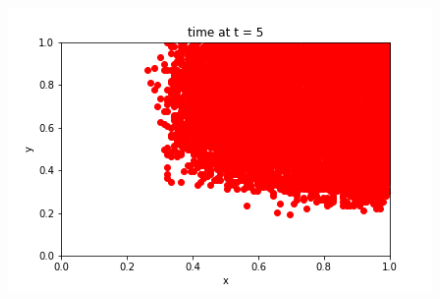 \documentclass[12pt, reqno]{amsart}
\begin{document}
\begin{figure}[h]
\begin{minipage}[b]{0.45 \textwidth}
            \caption{}
            \label{fig:day2}
        \end{minipage}
        \hfill
        \begin{minipage}[b]{0.45 \textwidth}
            \includegraphics[width=\textwidth]{./discrete/infected_grid5.png}
            \caption{}
            \label{fig:day5}
        \end{minipage}
    \end{figure}

 \newpage 
\end{document}
